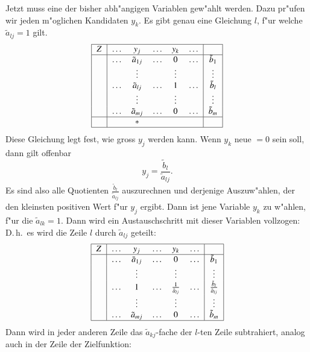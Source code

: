 Jetzt muss eine der bisher abh"angigen Variablen gew"ahlt werden.
Dazu pr"ufen wir jeden m"oglichen Kandidaten $y_k$. Es gibt genau
eine Gleichung $l$, f"ur welche $\tilde a_{lj}=1$ gilt.
\[
\begin{tabular}{|>{$}c<{$}|>{$}c<{$}>{$}c<{$}>{$}c<{$}>{$}c<{$}>{$}c<{$}|>{$}c<{$}|}
\hline
Z&\dots &y_j           &\dots&y_k   &\dots  & \\
\hline
&\dots &\tilde a_{1j} &\dots& 0    & \dots &\tilde b_1\\
&      &\vdots        &     &\vdots&       &\vdots    \\
&\dots &\tilde a_{lj} &\dots& 1    & \dots &\tilde b_l\\
&      &\vdots        &     &\vdots&       &\vdots    \\
&\dots &\tilde a_{mj} &\dots& 0    & \dots &\tilde b_m\\
\hline
&      &*             &     &      &       &          \\
\hline
\end{tabular}
\]
Diese Gleichung legt fest, wie gross $y_j$ werden kann. Wenn $y_k$
neue $=0$ sein soll, dann gilt offenbar
\[
y_j =\frac{\tilde b_{l}}{\tilde a_{lj}}.
\]
Es sind also alle Quotienten $\frac{\tilde b_l}{\tilde a_{lj}}$ auszurechnen
und derjenige Auszuw"ahlen, der den kleinsten positiven Wert f"ur $y_j$ ergibt.
Dann ist jene Variable $y_k$ zu w"ahlen, f"ur die $\tilde a_{lk}=1$.
Dann wird ein Austauschschritt mit dieser Variablen vollzogen:
D.\,h.~es wird die Zeile $l$ durch $\tilde a_{lj}$ geteilt:
\[
\begin{tabular}{|>{$}c<{$}|>{$}c<{$}>{$}c<{$}>{$}c<{$}>{$}c<{$}>{$}c<{$}|>{$}c<{$}|}
\hline
Z&\dots &y_j           &\dots&y_k   &\dots           & \\
\hline
&\dots &\tilde a_{1j} &\dots& 0    & \dots          &\tilde b_1\\
&      &\vdots        &     &\vdots&                &\vdots    \\
&\dots &1             &\dots&\frac{1}{\tilde a_{lj}}& \dots &\frac{\tilde b_l}{\tilde a_{lj}}\\
&      &\vdots        &     &\vdots&                &\vdots    \\
&\dots &\tilde a_{mj} &\dots& 0    & \dots          &\tilde b_m\\
\hline
\end{tabular}
\]
Dann wird in jeder anderen Zeile das $\tilde a_{kj}$-fache der $l$-ten
Zeile subtrahiert, analog auch in der Zeile der Zielfunktion:
